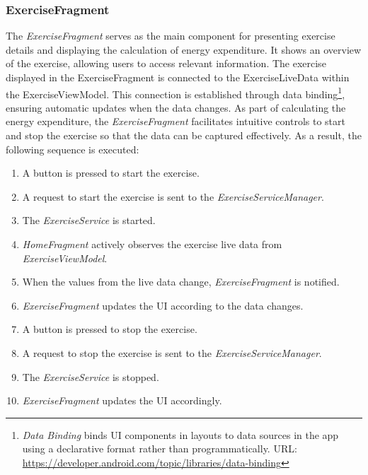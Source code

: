 \subsubsection{ExerciseFragment}
The \emph{ExerciseFragment} serves as the main component for presenting exercise details and displaying the calculation of energy expenditure. 
It shows an overview of the exercise, allowing users to access relevant information.
The exercise displayed in the ExerciseFragment is connected to the ExerciseLiveData within the ExerciseViewModel. This connection is established through data binding\footnote{\emph{Data Binding} binds UI components in layouts to data sources in the app using a declarative format rather than programmatically. URL: \url{https://developer.android.com/topic/libraries/data-binding}}, ensuring automatic updates when the data changes. 
As part of calculating the energy expenditure, the \emph{ExerciseFragment} facilitates intuitive controls to start and stop the exercise so that the data can be captured effectively. As a result, the following sequence is executed:

\begin{enumerate}
    \item A button is pressed to start the exercise.
    \item A request to start the exercise is sent to the \emph{ExerciseServiceManager}.
    \item The \emph{ExerciseService} is started.
    \item \emph{HomeFragment} actively observes the exercise live data from \emph{ExerciseViewModel}.
    \item When the values from the live data change, \emph{ExerciseFragment} is notified.
    \item \emph{ExerciseFragment} updates the UI according to the data changes.
    \item A button is pressed to stop the exercise.
    \item A request to stop the exercise is sent to the \emph{ExerciseServiceManager}.
    \item The \emph{ExerciseService} is stopped.
    \item \emph{ExerciseFragment} updates the UI accordingly.
\end{enumerate}

